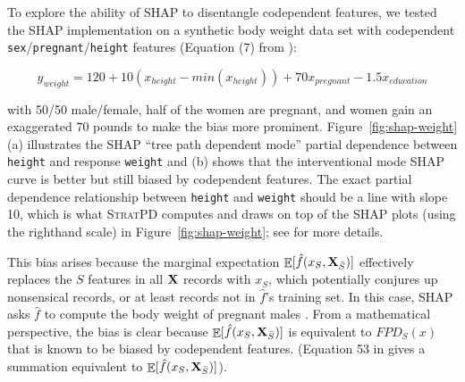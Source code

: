 \documentclass[11pt]{article}
\newcommand{\figref}[1]{Figure~\ref{#1}}
\newcommand{\todo}[1]{{{\small\color{red}{[#1]}}}}
\DeclareMathOperator{\Ex}{\mathbb{E}}
\newcommand{\spd}{\fontfamily{cmr}\textsc{\small StratPD}}
\begin{document}
To explore the ability of SHAP to disentangle codependent features, we tested the SHAP implementation on a synthetic body weight data set with codependent {\tt\small sex}/{\tt\small pregnant}/{\tt\small height} features (Equation (7) from \citealt{stratpd}):

\begin{equation}\label{eq:weight}
y_{weight}  = 120 + 10(x_{height} - min(x_{height})) + 70x_{pregnant} - 1.5x_{education}
\end{equation}

\noindent with 50/50 male/female, half of the women are pregnant, and women gain an exaggerated 70 pounds to make the bias more prominent. \figref{fig:shap-weight}(a) illustrates the SHAP ``tree path dependent mode'' partial dependence between {\tt height} and response {\tt weight} and (b) shows that the interventional mode SHAP curve is better but still biased by codependent features.  The exact partial dependence relationship between {\tt height} and {\tt weight} should be a line with slope 10, which is what \spd{} computes and draws on top of the SHAP plots (using the righthand scale) in \figref{fig:shap-weight}; see \citet{stratpd} for more details.

This bias arises because the marginal expectation $\Ex[\hat{f}(x_{S},{\bf X}_{\bar{S}})]$ effectively replaces the $S$ features in all $\bf X$ records with $x_S$, which potentially conjures up nonsensical records, or at least records not in $\hat{f}$'s training set.  In this case, SHAP asks $\hat{f}$ to compute the body weight of pregnant males \todo{wrong. fix}. From a mathematical perspective, the bias is clear because $\Ex[\hat{f}(x_{S},{\bf X}_{\bar{S}})]$ is equivalent to $FPD_S(x)$ that is known to be biased by codependent features. (Equation 53 in \citealt{PDP} gives a summation equivalent to $\Ex[\hat{f}(x_{S},{\bf X}_{\bar{S}})]$).  
\end{document}
